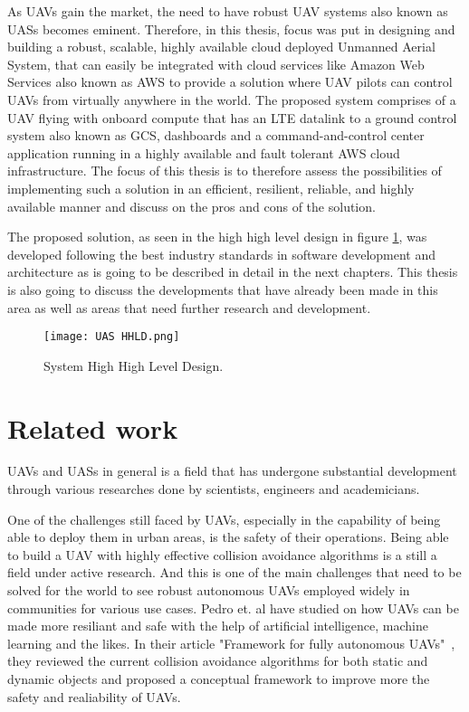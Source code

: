 As UAVs gain the market, the need to have robust UAV systems also known as UASs becomes eminent. Therefore, in this thesis, focus was put in designing and building a robust, scalable, highly available cloud deployed Unmanned Aerial System, that can easily be integrated with cloud services like Amazon Web Services also known as AWS to provide a solution where UAV pilots can control UAVs from virtually anywhere in the world. The proposed system comprises of a UAV flying with onboard compute that has an LTE datalink to a ground control system also known as GCS, dashboards and a command-and-control center application running in a highly available and fault tolerant AWS cloud infrastructure. The focus of this thesis is to therefore assess the possibilities of implementing such a solution in an efficient, resilient, reliable, and highly available manner and discuss on the pros and cons of the solution.

The proposed solution, as seen in the high high level design in figure \ref{fig:uas-hhld}, was developed following the best industry standards in software development and architecture as is going to be described in detail in the next chapters. This thesis is also going to discuss the developments that have already been made in this area as well as areas that need further research and development.

\begin{figure}[!h]
    \centering \texttt{[image: UAS HHLD.png]}
    \caption{System High High Level Design.}
    \label{fig:uas-hhld}
\end{figure}


\section{Related work}
\label{sec:related-work}

UAVs and UASs in general is a field that has undergone substantial development through various researches done by scientists, engineers and academicians.

One of the challenges still faced by UAVs, especially in the capability of being able to deploy them in urban areas, is the safety of their operations. Being able to build a UAV with highly effective collision avoidance algorithms is a still a field under active research. And this is one of the main challenges that need to be solved for the world to see robust autonomous UAVs employed widely in communities for various use cases. Pedro et. al have studied on how UAVs can be made more resiliant and safe with the help of artificial intelligence, machine learning and the likes. In their article "Framework for fully autonomous UAVs"~\cite{Pedro2020}, they reviewed the current collision avoidance algorithms for both static and dynamic objects and proposed a conceptual framework to improve more the safety and realiability of UAVs.

